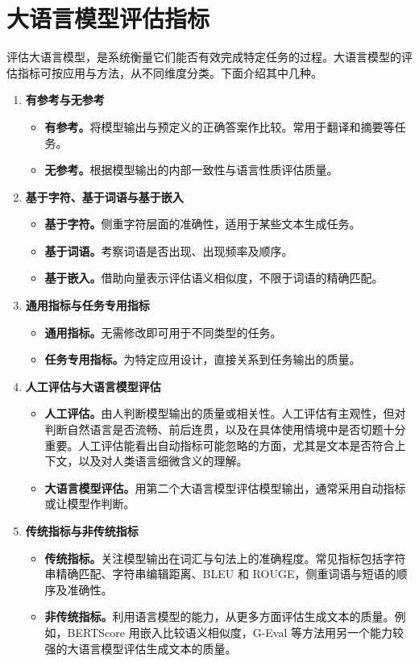 \section{大语言模型评估指标}
\label{sec:ch08-metrics}
评估大语言模型，是系统衡量它们能否有效完成特定任务的过程。大语言模型的评估指标可按应用与方法，从不同维度分类。下面介绍其中几种。

\begin{enumerate}
\item \textbf{有参考与无参考}
  \begin{itemize}
  \item \textbf{有参考。}将模型输出与预定义的正确答案作比较。常用于翻译和摘要等任务。
  \item \textbf{无参考。}根据模型输出的内部一致性与语言性质评估质量。
  \end{itemize}
\item \textbf{基于字符、基于词语与基于嵌入}
  \begin{itemize}
  \item \textbf{基于字符。}侧重字符层面的准确性，适用于某些文本生成任务。
  \item \textbf{基于词语。}考察词语是否出现、出现频率及顺序。
  \item \textbf{基于嵌入。}借助向量表示评估语义相似度，不限于词语的精确匹配。
  \end{itemize}
\item \textbf{通用指标与任务专用指标}
  \begin{itemize}
  \item \textbf{通用指标。}无需修改即可用于不同类型的任务。
  \item \textbf{任务专用指标。}为特定应用设计，直接关系到任务输出的质量。
  \end{itemize}
\item \textbf{人工评估与大语言模型评估}
  \begin{itemize}
  \item \textbf{人工评估。}由人判断模型输出的质量或相关性。人工评估有主观性，但对判断自然语言是否流畅、前后连贯，以及在具体使用情境中是否切题十分重要。人工评估能看出自动指标可能忽略的方面，尤其是文本是否符合上下文，以及对人类语言细微含义的理解。
  \item \textbf{大语言模型评估。}用第二个大语言模型评估模型输出，通常采用自动指标或让模型作判断。
  \end{itemize}
\item \textbf{传统指标与非传统指标}
  \begin{itemize}
  \item \textbf{传统指标。}关注模型输出在词汇与句法上的准确程度。常见指标包括字符串精确匹配、字符串编辑距离、BLEU 和 ROUGE，侧重词语与短语的顺序及准确性。
  \item \textbf{非传统指标。}利用语言模型的能力，从更多方面评估生成文本的质量。例如，BERTScore 用嵌入比较语义相似度，G-Eval 等方法用另一个能力较强的大语言模型评估生成文本的质量。
  \end{itemize}
\end{enumerate}

